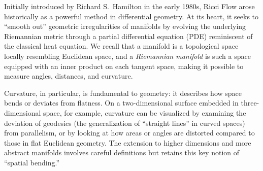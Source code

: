 Initially introduced by Richard S.~Hamilton in the early 1980s, Ricci Flow arose historically as a powerful method in differential geometry. At its heart, it seeks to ``smooth out'' geometric irregularities of manifolds by evolving the underlying Riemannian metric through a partial differential equation (PDE) reminiscent of the classical heat equation. We recall that a manifold is a topological space locally resembling Euclidean space, and a \emph{Riemannian manifold} is such a space equipped with an inner product on each tangent space, making it possible to measure angles, distances, and curvature. 

Curvature, in particular, is fundamental to geometry: it describes how space bends or deviates from flatness. On a two-dimensional surface embedded in three-dimensional space, for example, curvature can be visualized by examining the deviation of geodesics (the generalization of ``straight lines'' in curved spaces) from parallelism, or by looking at how areas or angles are distorted compared to those in flat Euclidean geometry. The extension to higher dimensions and more abstract manifolds involves careful definitions but retains this key notion of ``spatial bending.'' 


